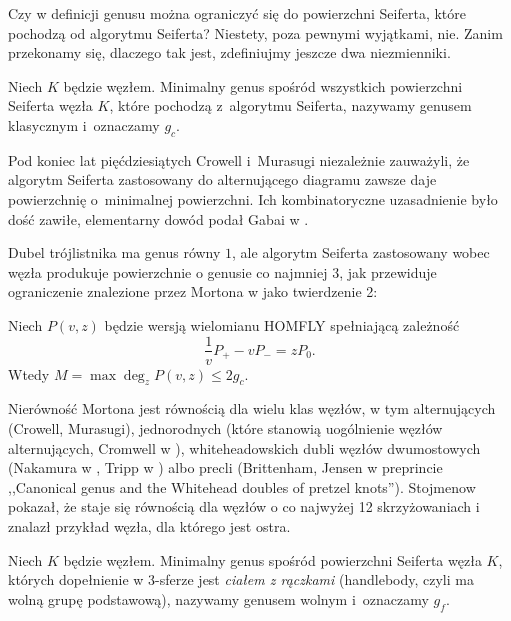 Czy w definicji genusu można ograniczyć się do powierzchni Seiferta, które pochodzą od algorytmu Seiferta?
Niestety, poza pewnymi wyjątkami, nie.
Zanim przekonamy się, dlaczego tak jest, zdefiniujmy jeszcze dwa niezmienniki.

\begin{definition}
    Niech $K$ będzie węzłem.
    Minimalny genus spośród wszystkich powierzchni Seiferta węzła $K$, które pochodzą z~algorytmu Seiferta, nazywamy genusem klasycznym i~oznaczamy $g_c$.
\end{definition}

Pod koniec lat pięćdziesiątych Crowell i~Murasugi niezależnie zauważyli, że algorytm Seiferta zastosowany do alternującego diagramu zawsze daje powierzchnię o~minimalnej powierzchni.
Ich kombinatoryczne uzasadnienie było dość zawiłe, elementarny dowód podał Gabai w \cite{gabai86}.

Dubel trójlistnika ma genus równy $1$, ale algorytm Seiferta zastosowany wobec węzła produkuje powierzchnie o genusie co najmniej $3$, jak przewiduje ograniczenie znalezione przez Mortona w \cite{morton86} jako twierdzenie 2:

\begin{proposition}
    Niech $P(v, z)$ będzie wersją wielomianu HOMFLY spełniającą zależność
    \begin{equation}
        \frac 1v P_+ - vP_- = zP_0.
    \end{equation}
    Wtedy $M = \max \deg_z P(v, z) \le 2g_c$.
\end{proposition}

Nierówność Mortona jest równością dla wielu klas węzłów, w tym alternujących (Crowell, Murasugi), jednorodnych (które stanowią uogólnienie węzłów alternujących, Cromwell w \cite{cromwell89}), whiteheadowskich dubli węzłów dwumostowych (Nakamura w \cite{nakamura06}, Tripp w \cite{tripp02}) albo precli (Brittenham, Jensen w preprincie ,,Canonical genus and the Whitehead doubles of pretzel knots'').
Stojmenow pokazał, że staje się równością dla węzłów o co najwyżej 12 skrzyżowaniach i znalazł przykład węzła, dla którego jest ostra.

\begin{definition}
    Niech $K$ będzie węzłem.
    Minimalny genus spośród powierzchni Seiferta węzła $K$, których dopełnienie w 3-sferze jest \emph{ciałem z rączkami} (handlebody, czyli ma wolną grupę podstawową), nazywamy genusem wolnym i~oznaczamy $g_f$.
\end{definition}

